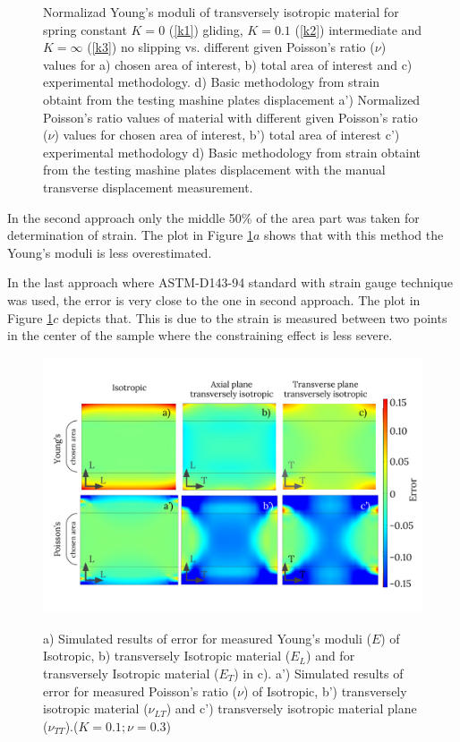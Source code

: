 \documentclass[review]{elsarticle}
\begin{document}
\begin{center}
\begin{figure}[h]
\captionsetup{justification=centering}
\caption{Normalizad Young's moduli of transversely isotropic
material for spring constant $K=0$ (\ref{k1}) gliding, $K=0.1$ (\ref{k2})
intermediate and $K=\infty$ (\ref{k3}) no slipping vs.
different given Poisson's ratio ($\nu$) values for a) chosen area of
interest, b) total area of interest and c) experimental methodology.
d) Basic methodology from strain obtaint from the testing mashine plates
displacement a') Normalized Poisson's ratio values of material with different
given Poisson's ratio ($\nu$) values for chosen area of
interest, b') total area of interest c') experimental methodology d) Basic methodology from strain obtaint from the testing mashine plates
displacement with the manual transverse displacement measurement.}
\label{fig:strainmethods}


\end{figure}
\end{center}



In the second approach only the middle 50\% of the area part was
taken for determination of strain. The plot in Figure \ref{fig:strainmethods}$a$
shows that with this method the Young's moduli is less overestimated.\par
  In the last approach where ASTM-D143-94 standard
with strain gauge technique was used, the error is very close to the one in
second approach. The plot in Figure \ref{fig:strainmethods}$c$ depicts that.
This is due to the strain is measured between two points in the center of 
the sample where the constraining effect is less severe. 

\begin{figure}[h]
\centering
\includegraphics[width=\textwidth]{BarellingError.pdf}
\label{fig:Error}
\caption{\label{fig:Error} a) Simulated results of error for measured Young's
moduli ($E$) of Isotropic, b) transversely Isotropic material ($E_L$) and for
transversely Isotropic material ($E_T$) in c). 
a') Simulated results of error for measured
Poisson's ratio ($\nu$) of Isotropic, b')
transversely isotropic material ($\nu_{LT}$) and c') transversely isotropic
material plane ($\nu_{TT}$).($K=0.1;\nu=0.3$)}

\end{figure}
\end{document}
